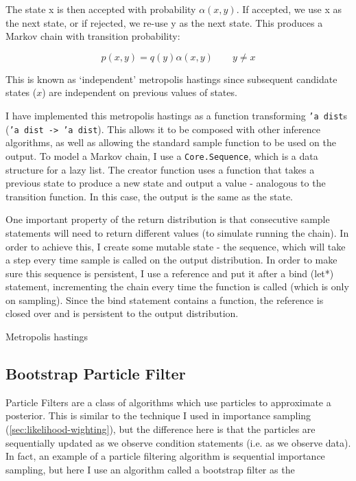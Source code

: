 The state x is then accepted with probability $\alpha(x,y)$. If accepted, we use x as the next state, or if rejected, we re-use y as the next state. This produces a Markov chain with transition probability:

$$p(x, y) = q(y)\alpha(x, y) \quad\quad y\neq x$$

This is known as `independent' metropolis hastings since subsequent candidate states ($x$) are independent on previous values of states.

I have implemented this metropolis hastings as a function transforming \texttt{'a dist}s (\texttt{'a dist -> 'a dist}). This allows it to be composed with other inference algorithms, as well as allowing the standard sample function to be used on the output. To model a Markov chain, I use a \texttt{Core.Sequence}, which is a data structure for a lazy list. The creator function uses a function that takes a previous state to produce a new state and output a value - analogous to the transition function. In this case, the output is the same as the state.

One important property of the return distribution is that consecutive sample statements will need to return different values (to simulate running the chain). In order to achieve this, I create some mutable state - the sequence, which will take a step every time sample is called on the output distribution. In order to make sure this sequence is persistent, I use a reference and put it after a bind (let*) statement, incrementing the chain every time the function is called (which is only on sampling). Since the bind statement contains a function, the reference is closed over and is persistent to the output distribution.

\begin{listing}[!htb]
	\centering
	\caption{Metropolis hastings}
	\label{lst:mh}
\end{listing}

\subsection{Bootstrap Particle Filter} \label{sec:pf}
Particle Filters are a class of algorithms which use particles to approximate a posterior. This is similar to the technique I used in importance sampling (\ref{sec:likelihood-wighting}), but the difference here is that the particles are sequentially updated as we observe condition statements (i.e. as we observe data). In fact, an example of a particle filtering algorithm is sequential importance sampling, but here I use an algorithm called a bootstrap filter\cite{particlefilter} as the 
\cite{anglican-smc}

